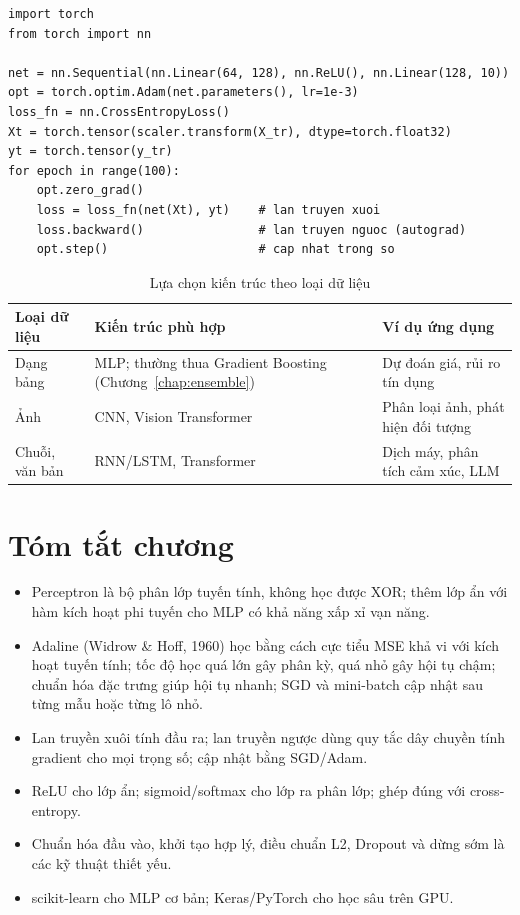 \begin{lstlisting}[caption={Vòng lặp huấn luyện tối giản với PyTorch}]
import torch
from torch import nn

net = nn.Sequential(nn.Linear(64, 128), nn.ReLU(), nn.Linear(128, 10))
opt = torch.optim.Adam(net.parameters(), lr=1e-3)
loss_fn = nn.CrossEntropyLoss()
Xt = torch.tensor(scaler.transform(X_tr), dtype=torch.float32)
yt = torch.tensor(y_tr)
for epoch in range(100):
    opt.zero_grad()
    loss = loss_fn(net(Xt), yt)    # lan truyen xuoi
    loss.backward()                # lan truyen nguoc (autograd)
    opt.step()                     # cap nhat trong so
\end{lstlisting}

\begin{table}[H]
\centering
\begin{tabular}{|p{3.2cm}|p{4.8cm}|p{4.8cm}|}
\hline
\textbf{Loại dữ liệu} & \textbf{Kiến trúc phù hợp} & \textbf{Ví dụ ứng dụng} \\
\hline
Dạng bảng & MLP; thường thua Gradient Boosting (Chương~\ref{chap:ensemble}) & Dự đoán giá, rủi ro tín dụng \\ \hline
Ảnh & CNN, Vision Transformer & Phân loại ảnh, phát hiện đối tượng \\ \hline
Chuỗi, văn bản & RNN/LSTM, Transformer & Dịch máy, phân tích cảm xúc, LLM \\ \hline
\end{tabular}
\caption{Lựa chọn kiến trúc theo loại dữ liệu}
\end{table}

\section{Tóm tắt chương}
\begin{itemize}
    \item Perceptron là bộ phân lớp tuyến tính, không học được XOR; thêm lớp ẩn với hàm kích hoạt phi tuyến cho MLP có khả năng xấp xỉ vạn năng.
    \item Adaline (Widrow \& Hoff, 1960) học bằng cách cực tiểu MSE khả vi với kích hoạt tuyến tính; tốc độ học quá lớn gây phân kỳ, quá nhỏ gây hội tụ chậm; chuẩn hóa đặc trưng giúp hội tụ nhanh; SGD và mini-batch cập nhật sau từng mẫu hoặc từng lô nhỏ.
    \item Lan truyền xuôi tính đầu ra; lan truyền ngược dùng quy tắc dây chuyền tính gradient cho mọi trọng số; cập nhật bằng SGD/Adam.
    \item ReLU cho lớp ẩn; sigmoid/softmax cho lớp ra phân lớp; ghép đúng với cross-entropy.
    \item Chuẩn hóa đầu vào, khởi tạo hợp lý, điều chuẩn L2, Dropout và dừng sớm là các kỹ thuật thiết yếu.
    \item scikit-learn cho MLP cơ bản; Keras/PyTorch cho học sâu trên GPU.
\end{itemize}

